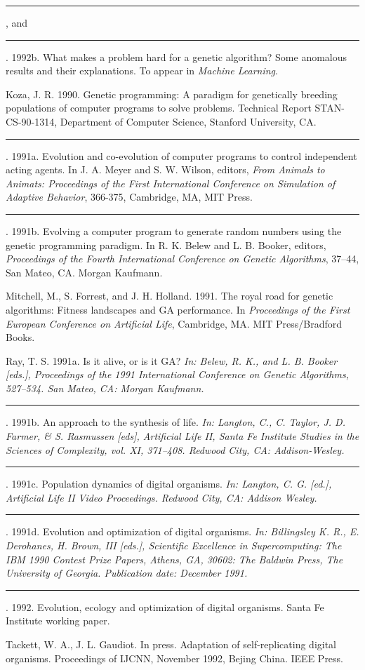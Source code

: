 \rule[0pt]{3em}{.4pt}, and \rule[0pt]{3em}{.4pt}.  1992b.  What makes a
problem hard for a genetic algorithm?  Some anomalous results and their
explanations.  To appear in {\it Machine Learning}.

Koza, J. R.  1990.  Genetic programming: A paradigm for genetically breeding
populations of computer programs to solve problems.  Technical Report
STAN-CS-90-1314, Department of Computer Science, Stanford University, CA.

\rule[0pt]{3em}{.4pt}.  1991a.  Evolution and co-evolution of computer
programs to control independent acting agents.  In J. A. Meyer and
S. W. Wilson, editors, {\it From Animals to Animats: Proceedings of the
First International Conference on Simulation of Adaptive Behavior},
366-375, Cambridge, MA, MIT Press.

\rule[0pt]{3em}{.4pt}.  1991b.  Evolving a computer program to generate
random numbers using the genetic programming paradigm.  In R. K. Belew
and L. B. Booker, editors, {\it Proceedings of the Fourth International
Conference on Genetic Algorithms}, 37--44, San Mateo, CA.  Morgan Kaufmann.

Mitchell, M., S. Forrest, and J. H. Holland.  1991.  The royal road for
genetic algorithms: Fitness landscapes and GA performance.  In
{\it Proceedings of the First European Conference on Artificial Life},
Cambridge, MA.  MIT Press/Bradford Books.

Ray, T. S.  1991a.  Is it alive, or is it GA?
\it In\rm : Belew, R. K., and L. B. Booker [eds.], Proceedings of the 1991
International Conference on Genetic Algorithms, 527--534.  San Mateo, CA:
Morgan Kaufmann.

\rule[0pt]{3em}{.4pt}.  1991b.  An approach to the synthesis of life.
\it In\rm : Langton, C., C. Taylor, J. D. Farmer, \& S. Rasmussen [eds],
Artificial Life II, Santa Fe Institute Studies in the Sciences of
Complexity, vol. XI, 371--408.  Redwood City, CA: Addison-Wesley.

\rule[0pt]{3em}{.4pt}.  1991c.  Population dynamics of digital organisms.
\it In\rm : Langton, C. G. [ed.], Artificial Life II Video Proceedings.
Redwood City, CA: Addison Wesley.

\rule[0pt]{3em}{.4pt}.  1991d.  Evolution and optimization of digital
organisms.  \it In\rm : Billingsley K. R., E. Derohanes, H. Brown, III [eds.],
Scientific Excellence in Supercomputing: The IBM 1990 Contest Prize Papers,
Athens, GA, 30602: The Baldwin Press, The University of Georgia.  Publication
date: December 1991.

\rule[0pt]{3em}{.4pt}.  1992.  Evolution, ecology and optimization of digital
organisms.  Santa Fe Institute working paper.

Tackett, W. A., J. L. Gaudiot.  In press.
Adaptation of self-replicating digital organisms.
Proceedings of IJCNN, November 1992, Bejing China.  IEEE Press.

\eXP


